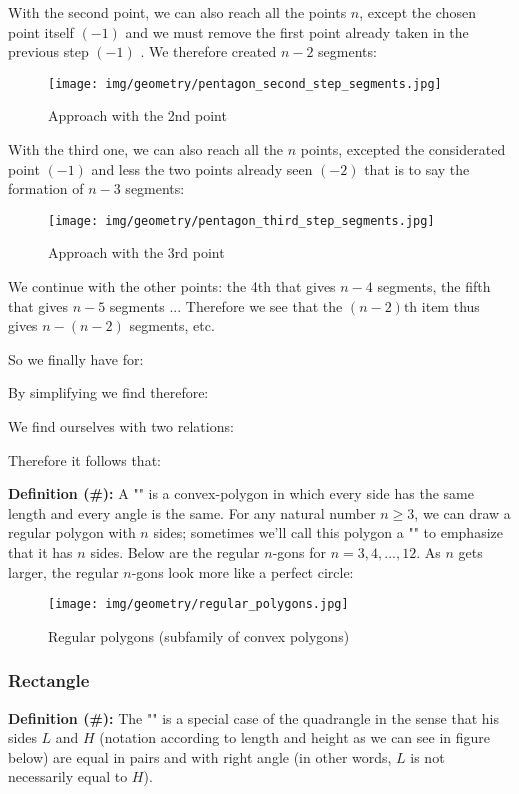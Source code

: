 {	With the second point, we can also reach all the points $n$, except the chosen point itself $(-1)$ and we must remove the first point already taken in the previous step $(-1)$ . We therefore created $n-2$ segments:

	\begin{figure}[H]
	\centering
		\texttt{[image: img/geometry/pentagon\_second\_step\_segments.jpg]}
	\caption{Approach with the 2nd point}
	\end{figure}
	With the third one, we can also reach all the $n$ points, excepted the considerated point $(-1)$ and less the two points already seen $(-2)$ that is to say the formation of $n-3$ segments:
	\begin{figure}[H]
	\centering
		\texttt{[image: img/geometry/pentagon\_third\_step\_segments.jpg]}
	\caption{Approach with the 3rd point}
	\end{figure}
	We continue with the other points: the 4th that gives $n - 4$ segments, the fifth that gives $n - 5$ segments ... Therefore we see that the $(n - 2)\text{th}$ item thus gives $n - (n - 2 )$ segments, etc.
	
	So we finally have for:
	
	By simplifying we find therefore:
	
	We find ourselves with two relations:
	
	Therefore it follows that:
	
	
	\textbf{Definition (\#\mydef):} A "\label{regular polygon}" is a convex-polygon in which every side has the same length and every angle is the same. For any natural number $n\geq 3$, we can draw a regular polygon with $n$ sides; sometimes we'll call this polygon a "" to emphasize that it has $n$ sides. Below are the regular $n$-gons for $n = 3, 4, ..., 12$. As $n$ gets larger, the regular $n$-gons look more like a perfect circle:
	\begin{figure}[H]
	\centering
		\texttt{[image: img/geometry/regular\_polygons.jpg]}
	\caption{Regular polygons (subfamily of convex polygons)}
	\end{figure}
	
	\subsubsection{Rectangle}
	\textbf{Definition (\#\mydef):} The "" is a special case of the quadrangle in the sense that his sides $L$ and $H$ (notation according to length and height as we can see in figure below) are equal in pairs and with right angle (in other words, $L$ is not necessarily equal to $H$).
	
}
